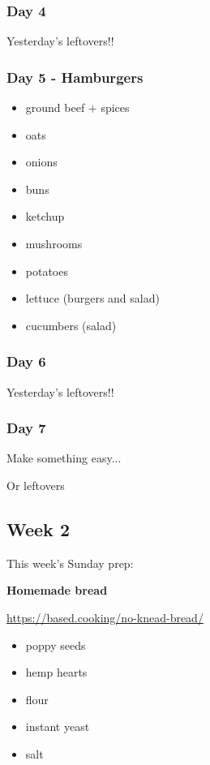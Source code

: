 \documentclass[11pt, a4paper]{article}
\begin{document}
\subsubsection{Day 4}
\vspace{1pc}
Yesterday's leftovers!!

\subsubsection{Day 5 - Hamburgers}
\vspace{1pc}
\begin{itemize}
\item ground beef $+$ spices
\item oats
\item onions
\item buns
\item ketchup
\item mushrooms
\item potatoes
\item lettuce (burgers and salad)
\item cucumbers (salad)
\end{itemize}

\subsubsection{Day 6}
\vspace{1pc}
Yesterday's leftovers!!

\subsubsection{Day 7}
\vspace{1pc}
\noindent Make something easy...
\par
Or leftovers


\vspace{0.917 pc} %

\pagebreak
\subsection{Week 2}

This week's Sunday prep:
\par
\noindent\textbf{Homemade bread}
\par
\small{\url{https://based.cooking/no-knead-bread/}}
\begin{itemize}
\item poppy seeds
\item hemp hearts
\item flour
\item instant yeast
\item salt
\end{itemize}
\end{document}
